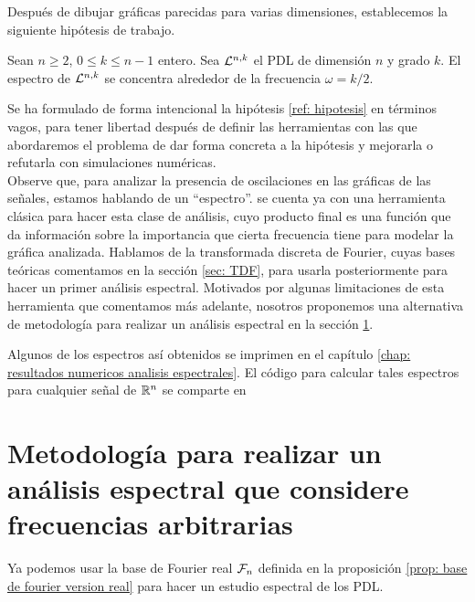 Después de dibujar gráficas parecidas para varias dimensiones, 
establecemos la siguiente hipótesis de trabajo.

\begin{hip}
\label{ref: hipotesis}
Sean $n \geq 2$, $0 \leq k \leq n-1$ entero. 
Sea $\mathcal{L}^{n,k}$ el PDL de dimensión $n$ y grado $k$.
El espectro de $\mathcal{L}^{n,k}$ se concentra alrededor
de la frecuencia $\omega = k/2$.
\end{hip}

Se ha formulado de forma intencional la hipótesis 
\ref{ref: hipotesis} en términos vagos, para tener libertad
después de definir las herramientas con las que abordaremos el problema
de dar forma concreta a la hipótesis y mejorarla o refutarla con simulaciones
numéricas. \\ 

Observe que, para analizar la presencia de oscilaciones
en las gráficas de las señales, estamos hablando de un ``espectro''.
se cuenta ya con una herramienta clásica para hacer esta clase de análisis,
cuyo producto final es 
una función que
da información sobre
la importancia que cierta frecuencia tiene para
modelar la gráfica analizada. Hablamos de la transformada 
discreta de Fourier, cuyas bases teóricas comentamos en la sección
\ref{sec: TDF},
para usarla posteriormente para hacer un primer análisis espectral. Motivados
por algunas limitaciones de esta herramienta que comentamos más adelante,
nosotros proponemos una alternativa de metodología para realizar un análisis espectral 
en la sección 
\ref{sec: metodologia para realizar un analisis espectral que considere frecuencias arbitrarias}.

Algunos de los espectros así obtenidos se imprimen en
el capítulo
\ref{chap: resultados numericos analisis espectrales}.
El código para calcular tales espectros para cualquier
señal de $\mathbb{R}^{n}$ se comparte en





\section{Metodología para realizar un análisis espectral que considere frecuencias arbitrarias}
\label{sec: metodologia para realizar un analisis espectral que considere frecuencias arbitrarias}

Ya podemos usar la base de Fourier real $\mathcal{F}_{n}$
definida en la proposición \ref{prop: base de fourier version real}
para hacer un estudio espectral de los PDL. \\

